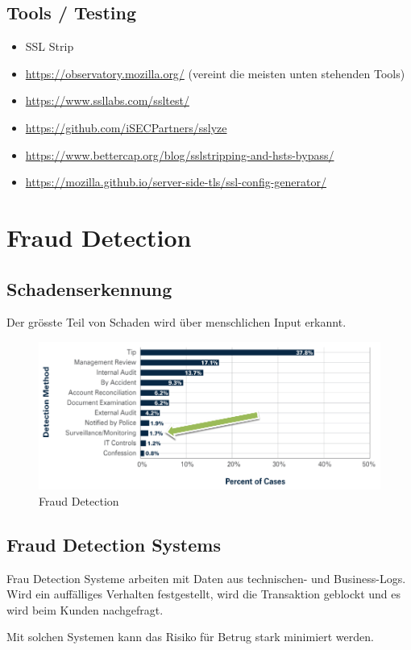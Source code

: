 \subsection{Tools / Testing}
\begin{itemize}
	\item SSL Strip
	\item \url{https://observatory.mozilla.org/} (vereint die meisten unten stehenden Tools)
	\item \url{https://www.ssllabs.com/ssltest/}
	\item \url{https://github.com/iSECPartners/sslyze}
	\item \url{https://www.bettercap.org/blog/sslstripping-and-hsts-bypass/}
	\item \url{https://mozilla.github.io/server-side-tls/ssl-config-generator/}
\end{itemize}

\section{Fraud Detection}

\subsection{Schadenserkennung}
Der grösste Teil von Schaden wird über menschlichen Input erkannt.

\begin{figure}[h!]
	\centering
	\includegraphics[width=0.7\linewidth]{images/fraud_detection}
	\caption{Fraud Detection}
	\label{fig:frauddetection}
\end{figure}

\subsection{Fraud Detection Systems}
Frau Detection Systeme arbeiten mit Daten aus technischen- und Business-Logs. Wird ein auffälliges Verhalten festgestellt, wird die Transaktion geblockt und es wird beim Kunden nachgefragt.

Mit solchen Systemen kann das Risiko für Betrug stark minimiert werden.

